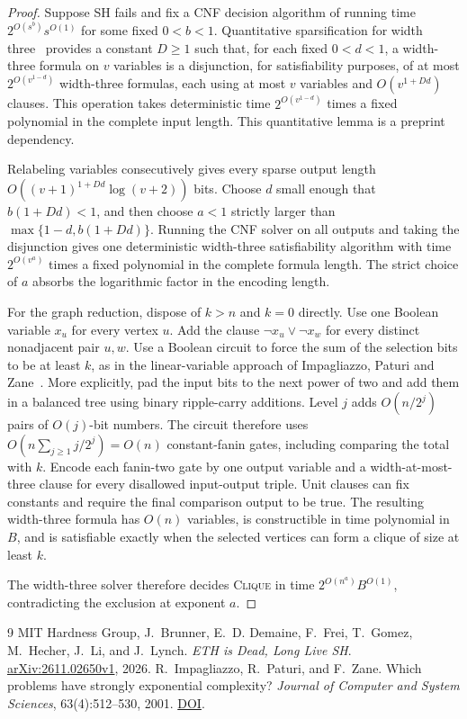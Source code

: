 \documentclass[11pt]{article}
\begin{document}
\begin{proof}
Suppose SH fails and fix a CNF decision algorithm of running time
\(2^{O(s^b)}s^{O(1)}\) for some fixed \(0<b<1\).
Quantitative sparsification for width three~\cite[Lemma~2.2]{sh}
provides a constant \(D\ge1\) such that, for each fixed \(0<d<1\),
a width-three formula on \(v\) variables is a disjunction, for
satisfiability purposes, of at most \(2^{O(v^{1-d})}\) width-three
formulas, each using at most \(v\) variables and
\(O(v^{1+Dd})\) clauses. This operation takes deterministic time
\(2^{O(v^{1-d})}\) times a fixed polynomial in the complete input
length. This quantitative lemma is a preprint dependency.

Relabeling variables consecutively gives every sparse output length
\(O((v+1)^{1+Dd}\log(v+2))\) bits. Choose \(d\) small enough that
\(b(1+Dd)<1\), and then choose \(a<1\) strictly larger than
\(\max\{1-d,b(1+Dd)\}\). Running the CNF solver on all outputs and taking
the disjunction gives one deterministic width-three satisfiability
algorithm with time \(2^{O(v^a)}\) times a fixed polynomial in the
complete formula length. The strict choice of \(a\) absorbs the
logarithmic factor in the encoding length.

For the graph reduction, dispose of \(k>n\) and \(k=0\) directly.
Use one Boolean variable \(x_u\) for every vertex \(u\). Add the clause
\(\neg x_u\lor\neg x_w\) for every distinct nonadjacent pair \(u,w\).
Use a Boolean circuit to force the sum of the selection bits to be
at least \(k\), as in the linear-variable approach of
Impagliazzo, Paturi and Zane~\cite[Theorem~5]{ipz}. More explicitly,
pad the input bits to the next power of two and add them in a balanced
tree using binary ripple-carry additions. Level \(j\) adds
\(O(n/2^j)\) pairs of \(O(j)\)-bit numbers. The circuit therefore uses
\(O(n\sum_{j\ge1}j/2^j)=O(n)\) constant-fanin gates, including comparing
the total with \(k\). Encode each fanin-two gate by one output variable
and a width-at-most-three clause for every disallowed input-output
triple. Unit clauses can fix constants and require the final comparison
output to be true. The resulting width-three formula has
\(O(n)\) variables, is constructible in time polynomial in \(B\), and is
satisfiable exactly when the selected vertices can form a clique of size
at least \(k\).

The width-three solver therefore decides \textsc{Clique} in time
\(2^{O(n^a)}B^{O(1)}\), contradicting the exclusion at exponent \(a\).
\end{proof}

\begin{thebibliography}{9}
MIT Hardness Group, J.~Brunner, E.~D. Demaine, F.~Frei, T.~Gomez,
M.~Hecher, J.~Li, and J.~Lynch.
\emph{ETH is Dead, Long Live SH}.
\href{https://arxiv.org/abs/2611.02650v1}{arXiv:2611.02650v1}, 2026.
R.~Impagliazzo, R.~Paturi, and F.~Zane.
Which problems have strongly exponential complexity?
\emph{Journal of Computer and System Sciences}, 63(4):512--530, 2001.
\href{https://doi.org/10.1006/jcss.2001.1774}{DOI}.
\end{thebibliography}
\end{document}

